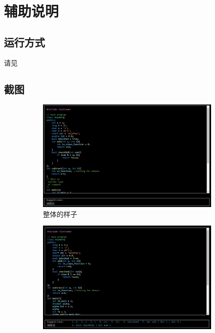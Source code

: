 \section{辅助说明}

\subsection{运行方式}

请见 

\subsection{截图}

\begin{figure}[h!]
    \centering
    \begin{subfigure}{0.45\textwidth}
        \centering
        \includegraphics[width=\linewidth]{imgs/整体的样子.png}
        \caption{整体的样子}
        \label{fig:1}
    \end{subfigure}
    \hspace{1em}
    \begin{subfigure}{0.45\linewidth}
        \centering
        \includegraphics[width=\linewidth]{imgs/类成员对象和成员函数补全.png}

\end{subfigure}
\end{figure}
